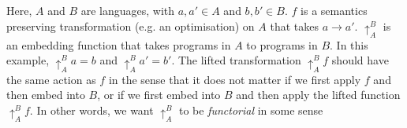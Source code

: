 \begin{figure}[h]
    \centering
\end{figure}

Here, $A$ and $B$ are languages, with $a, a' \in A$ and $b, b' \in B$.
% 
$f$ is a semantics preserving transformation (e.g. an optimisation) on $A$ that takes $a \to a'$.
% 
$\uparrow_A^B$ is an embedding function that takes programs in $A$ to programs in $B$.
% 
In this example, $\uparrow_A^B a = b$ and $\uparrow_A^B a' = b'$.
% 
The lifted transformation $\uparrow_A^B f$ should have the same action as $f$ 
in the sense that it does not matter if we first apply $f$ and then embed into $B$,
or if we first embed into $B$ and then apply the lifted function $\uparrow_A^B f$.
% 
In other words, we want $\uparrow_A^B$ to be \emph{functorial} in some sense



